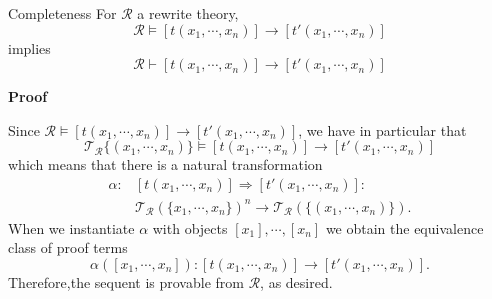 \documentclass{beamer}
\begin{document}
\begin{frame}
    \scriptsize
    \begin{block}{Completeness}
        For $\mathcal{R}$ a rewrite theory,
        $$ \mathcal{R} \models [t(x_1,\cdots,x_n)] \rightarrow [t'(x_1,\cdots,x_n)]
        $$
        implies
        $$\mathcal{R} \vdash [t(x_1,\cdots,x_n)] \rightarrow [t'(x_1,\cdots,x_n)]
        $$ 

        \pause
        \bigskip
        \textbf{Proof}

        Since $\mathcal{R} \models [t(x_1,\cdots,x_n)] \rightarrow [t'(x_1,\cdots,x_n)]$, we have in particular that 
        $$ \mathcal{T_R}\{(x_1,\cdots,x_n)\} \models [t(x_1,\cdots,x_n)] \rightarrow [t'(x_1,\cdots,x_n)]$$
        which means that there is a natural transformation 
        \begin{align*}
         \alpha:& [t(x_1,\cdots,x_n)] \Rightarrow [t'(x_1,\cdots,x_n)] : \\
        &\mathcal{T_R}(\{x_1,\cdots,x_n\})^n \rightarrow \mathcal{T_R}(\{(x_1,\cdots,x_n)\}).
        \end{align*}
        When we instantiate $\alpha$ with objects $[x_1],\cdots,[x_n]$ we obtain the equivalence class  
        of proof terms 
        $$\alpha([x_1,\cdots, x_n]): [t(x_1,\cdots,x_n)] \rightarrow [t'(x_1,\cdots,x_n)].
        $$
        Therefore,the sequent is provable from $\mathcal{R}$, as desired.
    \end{block}
\end{frame}
\end{document}
